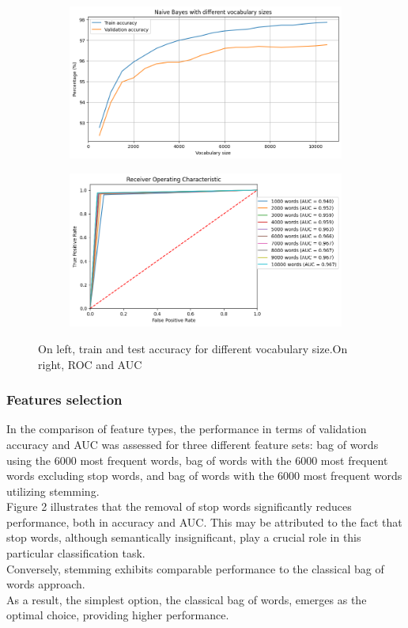 \documentclass{class}
\begin{document}
\begin{figure}[h]
    \begin{subfigure}{.5\linewidth}
        \includegraphics[width=\linewidth]{images/naive_voc_size.png}
    \end{subfigure}%
    \begin{subfigure}{.5\linewidth}
        \includegraphics[width=\linewidth]{images/naive_voc_size_ROC.png}
    \end{subfigure}
    \caption{On left, train and test accuracy for different vocabulary size.On right, ROC and AUC}
    \label{fig-1}
\end{figure}
\subsubsection*{Features selection}
In the comparison of feature types, the performance in terms of validation accuracy and AUC was assessed for three different feature sets:
bag of words using the 6000 most frequent words, bag of words with the 6000 most frequent words excluding stop words,
and bag of words with the 6000 most frequent words utilizing stemming.\\
Figure 2 illustrates that the removal of stop words significantly reduces performance, both in accuracy and AUC.
This may be attributed to the fact that stop words, although semantically insignificant, play a crucial role in this particular classification task.\\
Conversely, stemming exhibits comparable performance to the classical bag of words approach.\\
As a result, the simplest option, the classical bag of words, emerges as the optimal choice, providing higher performance.
\end{document}
